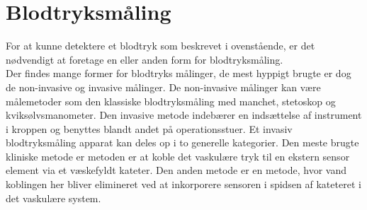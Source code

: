 \section{Blodtryksmåling}
For at kunne detektere et blodtryk som beskrevet i ovenstående, er det nødvendigt at foretage en eller anden form for blodtryksmåling. \\
Der findes mange former for blodtryks målinger, de mest hyppigt brugte er dog de non-invasive og invasive målinger. De non-invasive målinger kan være målemetoder som den klassiske blodtryksmåling med manchet, stetoskop og kviksølvsmanometer. Den invasive metode indebærer en indsættelse af instrument i kroppen og benyttes blandt andet på operationsstuer. Et invasiv blodtryksmåling apparat kan deles op i to generelle kategorier. Den meste brugte kliniske metode er metoden er at koble det vaskulære tryk til en ekstern sensor element via et væskefyldt kateter. Den anden metode er en metode, hvor vand koblingen her bliver elimineret ved at inkorporere sensoren i spidsen af kateteret i det vaskulære system.

